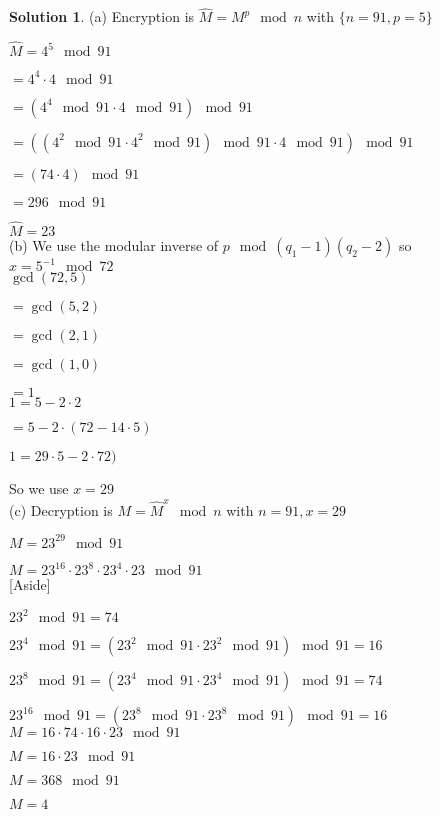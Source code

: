 \documentclass{article}
\theoremstyle{definition}
\newtheorem*{solution}{Solution}
\begin{document}
\begin{solution}

(a) Encryption is \(\hat{M}=M^p \mod n\) with \(\{n=91,p=5\}\)

\(\hat{M}=4^5 \mod 91\)

\(=4^4\cdot 4 \mod 91\)

\(=(4^4 \mod 91 \cdot 4 \mod 91) \mod 91\)

\(=((4^2 \mod 91 \cdot 4^2 \mod 91) \mod 91 \cdot 4 \mod 91) \mod 91\)

\(=(74 \cdot 4) \mod 91\)

\(=296 \mod 91\)

\(\hat{M} =23\) \\

(b) We use the modular inverse of \(p \mod (q_1-1)(q_2-2)\) so \(x=5^{-1}\mod 72\) \\

\(\gcd (72,5)\)

\(=\gcd (5,2)\)

\(=\gcd (2,1)\)

\(=\gcd (1,0)\)

\(=1\) \\

\(1=5-2\cdot 2\)

\(=5-2\cdot (72-14\cdot 5)\)

\(1=29\cdot 5-2\cdot 72)\)

So we use \(x=29\) \\

(c) Decryption is \(M=\hat{M}^x \mod n\) with \(n=91,x=29\)

\(M=23^{29} \mod 91\)

\(M=23^{16}\cdot 23^{8}\cdot 23^{4}\cdot 23 \mod 91\) \\

[Aside]

\(23^{2} \mod 91=74\)

\(23^{4} \mod 91=(23^{2} \mod 91 \cdot 23^{2} \mod 91) \mod 91=16\)

\(23^{8} \mod 91=(23^{4} \mod 91 \cdot 23^{4} \mod 91) \mod 91=74\)

\(23^{16} \mod 91=(23^{8} \mod 91 \cdot 23^{8} \mod 91) \mod 91=16\) \\

\(M=16\cdot 74\cdot 16\cdot 23 \mod 91\)

\(M=16\cdot 23 \mod 91\)

\(M=368 \mod 91\)

\(M=4\)

\end{solution}
\end{document}
